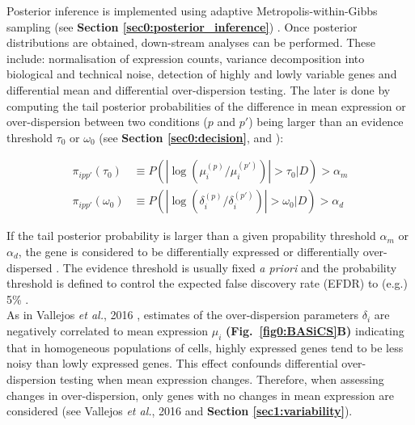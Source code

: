 Posterior inference is implemented using adaptive Metropolis-within-Gibbs sampling (see \textbf{Section \ref{sec0:posterior_inference}}) \citep{Vallejos2015BASiCS, Vallejos2016}. Once posterior distributions are obtained, down-stream analyses can be performed. These include: normalisation of expression counts, variance decomposition into biological and technical noise, detection of highly and lowly variable genes and differential mean and differential over-dispersion testing. The later is done by computing the tail posterior probabilities of the difference in mean expression or over-dispersion between two conditions ($p$ and $p'$) being larger than an evidence threshold $\tau_0$ or $\omega_0$ (see \textbf{Section \ref{sec0:decision}}, and \citep{Bochkina2007, Vallejos2016}):

\begin{align*}
\pi_{ipp'}(\tau_0)&\equiv{}P(|\log(\mu_i^{(p)}/\mu_i^{(p')})|>\tau_0|D)>\alpha_m\\
\pi_{ipp'}(\omega_0)&\equiv{}P(|\log(\delta_i^{(p)}/\delta_i^{(p')})|>\omega_0|D)>\alpha_d
\end{align*}

If the tail posterior probability is larger than a given propability threshold $\alpha_m$ or $\alpha_d$, the gene is considered to be differentially expressed or differentially over-dispersed \citep{Vallejos2016}. The evidence threshold is usually fixed \emph{a priori} and the probability threshold is defined to control the expected false discovery rate (EFDR) to (e.g.) 5\% \cite{Newton2004, Vallejos2016}.\\

As in Vallejos \emph{et al.}, 2016 \citep{Vallejos2016}, estimates of the over-dispersion parameters $\delta_i$ are negatively correlated to mean expression $\mu_i$ \textbf{(Fig.~\ref{fig0:BASiCS}B)} indicating that in homogeneous populations of cells, highly expressed genes tend to be less noisy than lowly expressed genes. This effect confounds differential over-dispersion testing when mean expression changes. Therefore, when assessing changes in over-dispersion, only genes with no changes in mean expression are considered (see Vallejos \emph{et al.}, 2016 \citep{Vallejos2016} and \textbf{Section \ref{sec1:variability}}).  
